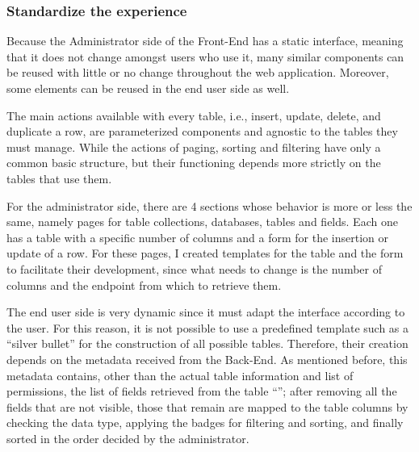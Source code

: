 \subsubsection{Standardize the experience}
Because the Administrator side of the Front-End has a static interface, meaning that it does not change amongst users who use it, many similar components can be reused with little or no change throughout the web application. Moreover, some elements can be reused in the end user side as well. 

The main actions available with every table, i.e., insert, update, delete, and duplicate a row, are parameterized components and agnostic to the tables they must manage. While the actions of paging, sorting and filtering have only a common basic structure, but their functioning depends more strictly on the tables that use them.

For the administrator side, there are 4 sections whose behavior is more or less the same, namely pages for table collections, databases, tables and fields. Each one has a table with a specific number of columns and a form for the insertion or update of a row. For these pages, I created templates for the table and the form to facilitate their development, since what needs to change is the number of columns and the endpoint from which to retrieve them.

The end user side is very dynamic since it must adapt the interface according to the user. For this reason, it is not possible to use a predefined template such as a ``silver bullet'' for the construction of all possible tables. Therefore, their creation depends on the metadata received from the Back-End. As mentioned before, this metadata contains, other than the actual table information and list of permissions, the list of fields retrieved from the table ``''; after removing all the fields that are not visible, those that remain are mapped to the table columns by checking the data type, applying the badges for filtering and sorting, and finally sorted in the order decided by the administrator.


